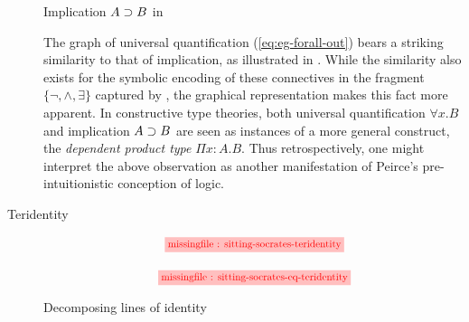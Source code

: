 \begin{description}
  \begin{marginfigure}
    \begin{center}
    \end{center}
    \caption{Implication $A \supset B$ in }
  \end{marginfigure}
  
  \begin{remark}
    
    The graph of universal quantification (\ref{eq:eg-forall-out}) bears a
    striking similarity to that of implication, as illustrated in
    . While the similarity also exists for the symbolic
    encoding of these connectives in the fragment $\{\neg, \land, \exists\}$
    captured by , the graphical representation makes this fact more
    apparent. In constructive type theories, both universal quantification
    $\forall x. B$ and implication $A \supset B$ are seen as instances of a more
    general construct, the \emph{dependent product type} $\Pi x : A. B$. Thus
    retrospectively, one might interpret the above observation as another
    manifestation of Peirce's pre-intuitionistic conception of logic.
  \end{remark}

  \item[Teridentity]
  
  \begin{marginfigure}
    \begin{gather}
    \tikzfig{0.8}{0.5}{sitting-socrates-teridentity} \label{eq:sitting-socrates-teridentity} \\[1em]
    \tikzfig{0.8}{0.5}{sitting-socrates-eq-teridentity} \label{eq:sitting-socrates-eq-teridentity}
    \end{gather}
    \caption{Decomposing lines of identity}
  \end{marginfigure}


\end{description}
